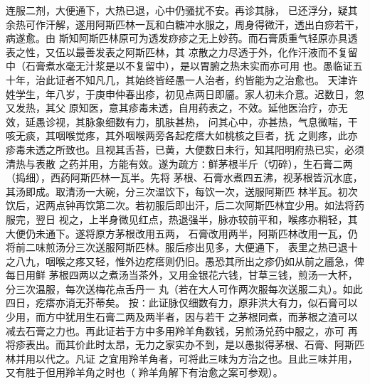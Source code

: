 \documentclass[a4paper,12pt,UTF8,twoside]{ctexbook}
\begin{document}
连服二剂，大便通下，大热已退，心中仍骚扰不安。再诊其脉， 
已还浮分，疑其余热可作汗解，遂用阿斯匹林一瓦和白糖冲水服之，周身得微汗，透出白痧若干，病遂愈。由 
斯知阿斯匹林原可为透发痧疹之无上妙药。而石膏质重气轻原亦具透表之性，又伍以最善发表之阿斯匹林，其 
凉散之力尽透于外，化作汗液而不复留中（石膏煮水毫无汁浆是以不复留中），是以胃腑之热未实而亦可用 
也。愚临证五十年，治此证者不知凡几，其始终皆经愚一人治者，约皆能为之治愈也。 
天津许姓学生，年八岁，于庚申仲春出疹，初见点两日即靥。家人初未介意。迟数日，忽又发热，其父 
原知医，意其疹毒未透，自用药表之，不效。延他医治疗，亦无效，延愚诊视，其脉象细数有力，肌肤甚热， 
问其心中，亦甚热，气息微喘，干咳无痰，其咽喉觉疼，其外咽喉两旁各起疙瘩大如桃核之巨者，抚 
之则疼，此亦疹毒未透之所致也。且视其舌苔，已黄，大便数日未行，知其阳明府热已实，必须清热与表散 
之药并用，方能有效。遂为疏方∶鲜茅根半斤（切碎），生石膏二两（捣细），西药阿斯匹林一瓦半。先将 
茅根、石膏水煮四五沸，视茅根皆沉水底，其汤即成。取清汤一大碗，分三次温饮下，每饮一次，送服阿斯匹 
林半瓦。初次饮后，迟两点钟再饮第二次。若初服后即出汗，后二次阿斯匹林宜少用。如法将药服完，翌日 
视之，上半身微见红点，热退强半，脉亦较前平和，喉疼亦稍轻，其大便仍未通下。遂将原方茅根改用五两， 
石膏改用两半，阿斯匹林改用一瓦，仍将前二味煎汤分三次送服阿斯匹林。服后疹出见多，大便通下， 
表里之热已退十之八九，咽喉之疼又轻，惟外边疙瘩则仍旧。愚恐其所出之疹仍如从前之靥急，俾每日用鲜 
茅根四两以之煮汤当茶外，又用金银花六钱，甘草三钱，煎汤一大杯，分三次温服，每次送梅花点舌丹一 
丸（若在大人可作两次服每次送服二丸）。如此四日，疙瘩亦消无芥蒂矣。 
按∶此证脉仅细数有力，原非洪大有力，似石膏可以少用，而方中犹用生石膏二两及两半者，因与若干 
之茅根同煮，而茅根之渣可以减去石膏之力也。再此证若于方中多用羚羊角数钱，另煎汤兑药中服之，亦可 
再将疹表出。而其价此时太昂，无力之家实办不到，是以愚拟得茅根、石膏、阿斯匹林并用以代之。凡证 
之宜用羚羊角者，可将此三味为方治之也。且此三味并用，又有胜于但用羚羊角之时也（ 
羚羊角解下有治愈之案可参观）。 
\end{document}
